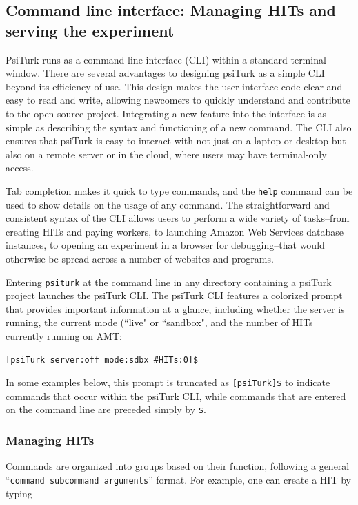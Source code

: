 \documentclass[twocolumn]{svjour3}          %
\begin{document}
\subsection{Command line interface: Managing HITs and serving the experiment}

PsiTurk runs as a command line interface (CLI) within a standard terminal window.
There are several advantages to designing psiTurk as a simple CLI beyond its efficiency of use. This
design makes the user-interface code clear and easy to read and write, allowing newcomers to quickly
understand and contribute to the open-source project. Integrating a new feature into the interface
is as simple as describing the syntax and functioning of a new command. The CLI also ensures that
psiTurk is easy to interact with not just on a laptop or desktop but also on a remote server or in
the cloud, where users may have terminal-only access.
 
Tab completion makes it quick to type commands, and the \texttt{help} command can be used to show
details on the usage of any command. 
The straightforward and consistent syntax of the CLI allows
users to perform a wide variety of tasks--from creating HITs and paying workers, to launching Amazon
Web Services database instances, to opening an experiment in a browser for debugging--that
would otherwise be spread across a number of websites and programs. 

Entering
\texttt{psiturk} at the command line in any directory containing a psiTurk project launches the
psiTurk CLI.
The psiTurk CLI features a colorized prompt that provides important information at a glance, including
whether the server is running, the current mode (``live" or ``sandbox", and the number of HITs currently running on AMT:

\begin{lstlisting}
[psiTurk server:off mode:sdbx #HITs:0]$
\end{lstlisting}

\noindent In some examples below, this prompt is truncated as \texttt{[psiTurk]\$} to indicate commands that occur within the psiTurk CLI, while commands that are entered on the command line are preceded simply by \texttt{\$}.


\subsubsection{Managing HITs}
Commands are organized into groups based on their function, following a general ``\texttt{command subcommand
arguments}'' format. For example, one can create a HIT by typing 
\end{document}
